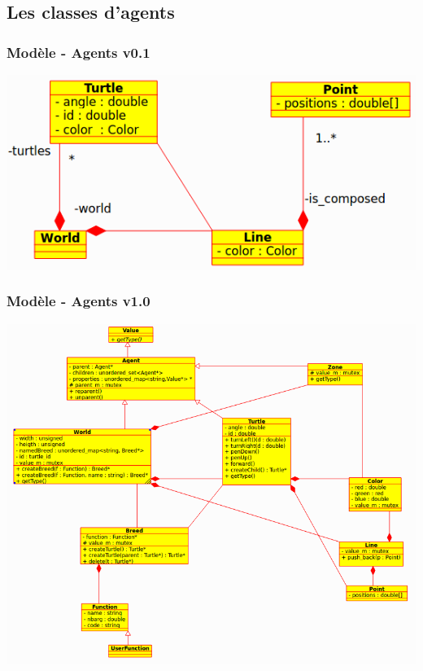 \subsection{Les classes d'agents}
\begin{frame}
\frametitle{Modèle - Agents v0.1}
\centering
\includegraphics[scale=0.4]{doc/Presentation/image/agent01.png}
\end{frame}

\begin{frame}
\frametitle{Modèle - Agents v1.0}
\centering
\includegraphics[scale=0.31]{doc/Presentation/image/agent03.png}
\end{frame}

